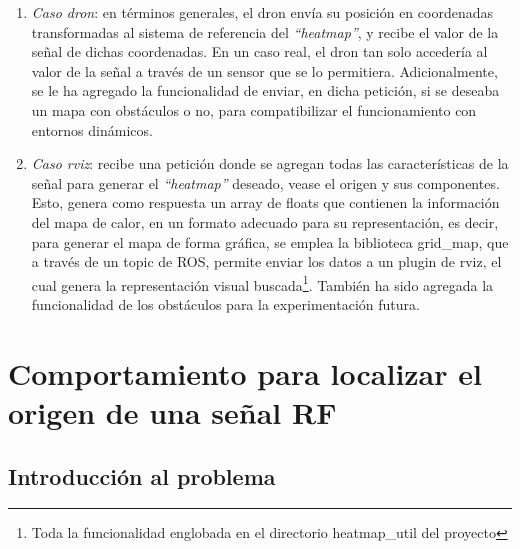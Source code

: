 \begin{enumerate}
	\item \emph{Caso dron}: en términos generales, el dron envía su posición en coordenadas transformadas al sistema de referencia del \emph{``heatmap''}, y recibe el valor de la señal de dichas coordenadas. En un caso real, el dron tan solo accedería al valor de la señal a través de un sensor que se lo permitiera. Adicionalmente, se le ha agregado la funcionalidad de enviar, en dicha petición, si se deseaba un mapa con obstáculos o no, para compatibilizar el funcionamiento con entornos dinámicos.

	\item \emph{Caso rviz}: recibe una petición donde se agregan todas las características de la señal para generar el \emph{``heatmap''} deseado, vease el origen y sus componentes. Esto, genera como respuesta un array de floats que contienen la información del mapa de calor, en un formato adecuado para su representación, es decir, para generar el mapa de forma gráfica, se emplea la biblioteca grid\_map, que a través de un topic de \ac{ROS}, permite enviar los datos a un plugin de rviz, el cual genera la representación visual buscada\footnote[3]{Toda la funcionalidad englobada en el directorio heatmap\_util del proyecto}. También ha sido agregada la funcionalidad de los obstáculos para la experimentación futura.
\end{enumerate}

\section{Comportamiento para localizar el origen de una señal \ac{RF}}
\label{sec:signal_follow}

\subsection{Introducción al problema}
\label{subsec:intro_sf}

